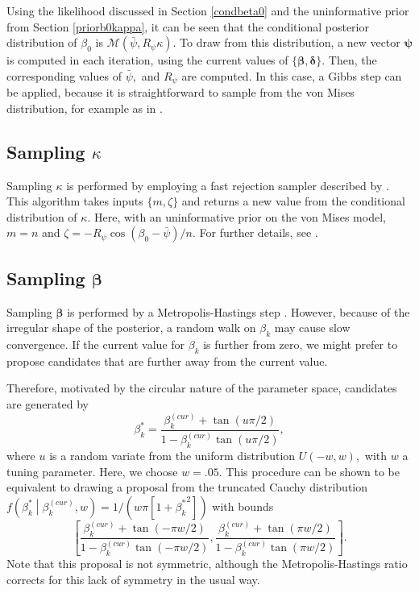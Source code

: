 \documentclass[11pt,a4paper]{article}\usepackage[]{graphicx}\usepackage[]{color}
\newcommand{\bdt}{\boldsymbol{\delta}}
\newcommand{\bbt}{\boldsymbol{\beta}}
\newcommand{\bps}{\boldsymbol{\psi}}
\newcommand{\relmiddle}[1]{\mathrel{}\middle#1\mathrel{}}
\begin{document}
Using the likelihood discussed in Section \ref{condbeta0} and the uninformative prior from Section \ref{priorb0kappa}, it can be seen that the conditional posterior distribution of \( \beta_0 \) is \( \mathcal{M}(\bar\psi, R_{\psi} \kappa).\)
To draw from this distribution, a new vector \( \bps \)  is computed in each iteration, using the current values of \( \{ \bbt, \bdt \} \). Then, the corresponding values of \( \bar\psi, \) and \( R_{\psi} \) are computed. In this case, a Gibbs step can be applied, because it is straightforward to sample from the von Mises distribution, for example as in \citet{best1979efficient}.

\subsection{Sampling $\kappa$}

Sampling \( \kappa \) is performed by employing a fast rejection sampler described by \citet{forbes2015fast}. This algorithm takes inputs \( \{ m, \zeta \} \) and returns a new value from the conditional distribution of \( \kappa \). Here, with an uninformative prior on the von Mises model, \( m = n \) and  \( \zeta = - R_\psi \cos(\beta_0 - \bar\psi) /n.\) For further details, see \citet{forbes2015fast}.


\subsection{Sampling $\bbt$}

Sampling \( \bbt \) is performed by a Metropolis-Hastings step \citep{metropolis1953equation, hastings1970monte}. However, because of the irregular shape of the posterior, a random walk on \( \beta_k \) may cause slow convergence. If the current value for \( \beta_k \) is further from zero, we might prefer to propose candidates that are further away from the current value.

Therefore, motivated by the circular nature of the parameter space, candidates are generated by
\begin{equation}
\beta_k^{*} = \frac{\beta_k^{(cur)} + \tan(u \pi / 2)}{1 - \beta_k^{(cur)} \tan(u \pi / 2)},
\end{equation}
where \( u \) is a random variate from the uniform distribution \( U(-w, w),\) with \( w \) a tuning parameter. Here, we choose \( w = .05. \) This procedure can be shown to be equivalent to drawing a proposal from the truncated Cauchy distribution \( f \left( \beta_k^{*} \relmiddle| \beta_k^{(cur)}, w \right) = 1 / \left( w \pi \left[ 1 + {\beta_k^{*}}^2 \right] \right) \) with bounds
\begin{equation*}
\left[ \frac{ \beta_k^{(cur)} + \tan(- \pi w / 2)}{1 - \beta_k^{(cur)} \tan(- \pi w / 2)}, \frac{ \beta_k^{(cur)} + \tan(\pi w / 2)}{1 - \beta_k^{(cur)} \tan(\pi w / 2)} \right].
\end{equation*}
Note that this proposal is not symmetric, although the Metropolis-Hastings ratio corrects for this lack of symmetry in the usual way.
\end{document}
